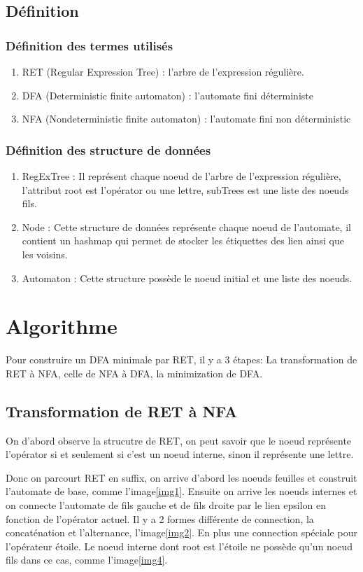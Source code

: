 \documentclass[14px]{article}
\begin{document}
\subsection{Définition}
\subsubsection{Définition des termes utilisés}
\begin{enumerate}
	\item RET (Regular Expression Tree) : l'arbre de l'expression régulière.
	\item DFA (Deterministic finite automaton) : l'automate fini déterministe
	\item NFA (Nondeterministic finite automaton) : l'automate fini non déterministic
\end{enumerate}

\subsubsection{Définition des structure de données}
\begin{enumerate}
	\item RegExTree : Il représent chaque noeud de l'arbre de l'expression régulière, l'attribut root est l'opérator ou une lettre, subTrees est une liste des noeuds fils. 
	\item Node : Cette structure de données représente chaque noeud de l'automate, il contient un hashmap qui permet de stocker les étiquettes des lien ainsi que les voisins.
	\item Automaton : Cette structure possède le noeud initial et une liste des noeuds.     
\end{enumerate}

\section{Algorithme}
Pour construire un DFA minimale par RET, il y a 3 étapes: La transformation de RET à NFA, celle de NFA à DFA, la minimization de DFA. 

\subsection{Transformation de RET à NFA}
On d'abord observe la strucutre de RET, on peut savoir que le noeud représente l'opérator si et seulement si c'est un noeud interne, sinon il représente une lettre.

Donc on parcourt RET en suffix, on arrive d'abord les noeuds feuilles et construit l'automate de base, comme l'image\ref{img1}. Ensuite on arrive les noeuds internes et on connecte l'automate de fils gauche et de fils droite par le lien epsilon en fonction de l'opérator actuel. Il y a 2 formes différente de connection, la concaténation et l'alternance, l'image\ref{img2}. En plus une connection spéciale pour l'opérateur étoile. Le noeud interne dont root est l'étoile ne possède qu'un noeud fils dans ce cas, comme l'image\ref{img4}.
\end{document}
